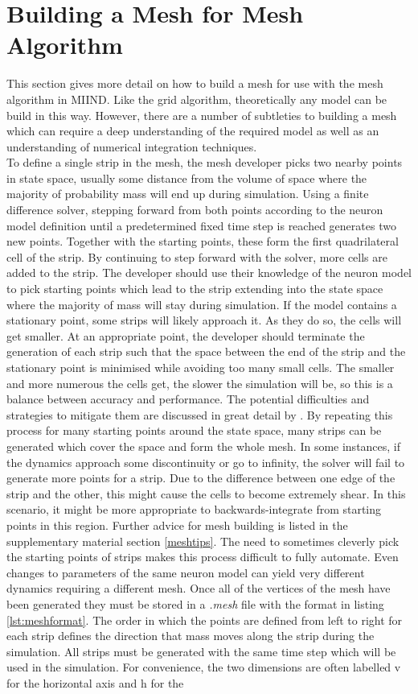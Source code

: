 \documentclass[utf8]{frontiers_suppmat} %
\begin{document}
\section{Building a Mesh for Mesh Algorithm}
\label{suppl:meshbuilding}
This section gives more detail on how to build a mesh for use with the mesh algorithm in MIIND. Like the grid algorithm, theoretically any model can be build in this way. However, there are a number of subtleties to building a mesh which can require a deep understanding of the required model as well as an understanding of numerical integration techniques.\\ 
To define a single strip in the mesh, the mesh developer picks two nearby points in state space, usually some distance from the volume of space where the majority of probability mass will end up during simulation. Using a finite difference solver, stepping forward from both points according to the neuron model definition until a predetermined fixed time step is reached generates two new points. Together with the starting points, these form the first quadrilateral cell of the strip. By continuing to step forward with the solver, more cells are added to the strip. The developer should use their knowledge of the neuron model to pick starting points which lead to the strip extending into the state space where the majority of mass will stay during simulation. If the model contains a stationary point, some strips will likely approach it. As they do so, the cells will get smaller. At an appropriate point, the developer should terminate the generation of each strip such that the space between the end of the strip and the stationary point is minimised while avoiding too many small cells. The smaller and more numerous the cells get, the slower the simulation will be, so this is a balance between accuracy and performance. The potential difficulties and strategies to mitigate them are discussed in great detail by \cite{de2019computational}. By repeating this process for many starting points around the state space, many strips can be generated which cover the space and form the whole mesh. In some instances, if the dynamics approach some discontinuity or go to infinity, the solver will fail to generate more points for a strip. Due to the difference between one edge of the strip and the other, this might cause the cells to become extremely shear. In this scenario, it might be more appropriate to backwards-integrate from starting points in this region. Further advice for mesh building is listed in the supplementary material section \ref{meshtips}. The need to sometimes cleverly pick the starting points of strips makes this process difficult to fully automate. Even changes to parameters of the same neuron model can yield very different dynamics requiring a different mesh. Once all of the vertices of the mesh have been generated they must be stored in a \textit{.mesh} file with the format in listing \ref{lst:meshformat}. The order in which the points are defined from left to right for each strip defines the direction that mass moves along the strip during the simulation. All strips must be generated with the same time step which will be used in the simulation. For convenience, the two dimensions are often labelled v for the horizontal axis and h for the 
\end{document}
